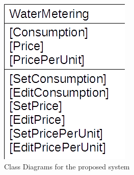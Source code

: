 \begin{figure}[H]
    \includegraphics[width=\textwidth]{./WaterMetering.png}
    \caption{Class Diagrams for the proposed system} \label{fig:WaterMetering Class Diagram}
\end{figure}

